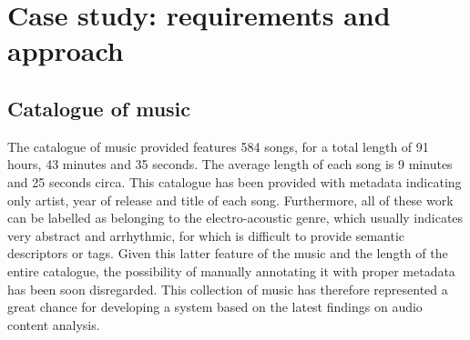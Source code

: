 \chapter{Case study: requirements and approach} %

\label{Chapter4} %


\section{Catalogue of music}
\label{sec:catalogue}
The catalogue of music provided features 584 songs, for a total length of 91 hours, 43 minutes and 35 seconds. The average length of each song is 9 minutes and 25 seconds circa. This catalogue has been provided with metadata indicating only artist, year of release and title of each song. Furthermore, all of these work can be labelled as belonging to the electro-acoustic genre, which usually indicates very abstract and arrhythmic, for which is difficult to provide semantic descriptors or tags. Given this latter feature of the music and the length of the entire catalogue, the possibility of manually annotating it with proper metadata has been soon disregarded. This collection of music has therefore represented a great chance for developing a system based on the latest findings on audio content analysis.

